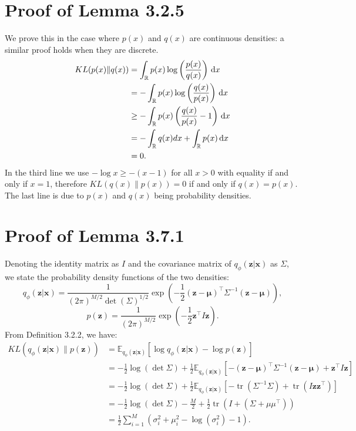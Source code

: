 \documentclass[honours,12pt, twoside]{unswthesis}
\newcommand{\R}{\mathbb{R}}
\newcommand{\E}{\mathbb{E}}
\DeclareMathOperator{\tr}{tr}
\numberwithin{equation}{section}
\theoremstyle{definition}
\begin{document}
\section{Proof of Lemma 3.2.5}\label{app:asdf}
We prove this in the case where $p(x)$ and $q(x)$ are continuous densities: a similar proof holds when they are discrete.
\begin{align*}
KL(p(x)\|q(x))&=\int_\R p(x)\log \left(\frac{p(x)}{q(x)}\right)\, {\rm d}x\\
&=-\int_\R p(x)\log \left(\frac{q(x)}{p(x)}\right)\, {\rm d}x\\
&\geq -\int_\R p(x) \left(\frac{q(x)}{p(x)}-1\right)\, {\rm d}x\\
&=-\int_\R q(x)dx + \int_\R p(x)\, {\rm d}x\\
&=0.
\end{align*}
In the third line we use $-\log x \geq -(x-1)$ for all $x>0$ with equality if and only if $x=1$, therefore $KL(q(x)\|p(x))=0$ if and only if $q(x)=p(x)$. The last line is due to $p(x)$ and $q(x)$ being probability densities.
\section{Proof of Lemma 3.7.1}\label{app:A.2}
Denoting the identity matrix as $I$ and the covariance matrix of $q_\phi(\bm{z}|\bm{x})$ as $\Sigma$, we state the probability density functions of the two densities:
\[q_\phi(\bm{z}|\bm{x})=\frac{1}{(2\pi)^{M/2}\det(\Sigma)^{1/2}}\exp\left(-\frac{1}{2}(\bm{z}-\bm{\mu})^\top\Sigma^{-1}(\bm{z}-\bm{\mu})\right),\]
\[p(\bm{z})=\frac{1}{(2\pi)^{M/2}}\exp\left(-\frac{1}{2}\bm{z}^\top I\bm{z}\right).\]
From Definition 3.2.2, we have:
\begin{align*}
KL(q_\phi(\bm{z}|\bm{x})\|p(\bm{z}))&=\E_{q_\phi(\bm{z}|\bm{x})}[\log q_\phi(\bm{z}|\bm{x})-\log p(\bm{z})]\\
&=-\frac{1}{2}\log(\det \Sigma)+\frac{1}{2}\E_{q_\phi(\bm{z}|\bm{x})}\left[-(\bm{z}-\bm{\mu})^\top \Sigma^{-1}(\bm{z}-\bm{\mu})+\bm{z}^\top I\bm{z}\right]\\
&=-\frac{1}{2}\log(\det \Sigma)+\frac{1}{2}\E_{q_\phi(\bm{z}|\bm{x})}\left[-\tr\left(\Sigma^{-1}\Sigma\right)+\tr\left(I\bm{z}\bm{z}^\top\right)\right]\\
&=-\frac{1}{2}\log(\det \Sigma)-\frac{M}{2}+\frac{1}{2}\tr\left(I+\left(\Sigma+\mu\mu^\top\right)\right)\\
&=\frac12 \sum_{i=1}^M\left(\sigma^2_i+\mu^2_i-\log(\sigma^2_i)-1\right).
\end{align*}
\end{document}

